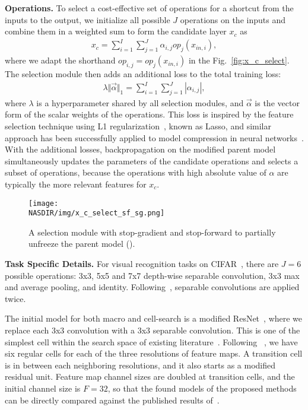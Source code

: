 \textbf{Operations.} 
To select a cost-effective set of operations for a shortcut from the inputs to the output, we initialize all possible $J$ operations on the inputs and combine them in a weighted sum to form the candidate layer $x_c$ as
\begin{align}
    x_c = \sum _{i=1}^I \sum_{j=1}^J \alpha_{i,j} op_j(x_{in,i}),
    \label{eq:x_c_select}
\end{align}
where we adapt the shorthand $op_{i,j} = op_j(x_{in,i})$ in the Fig.~\ref{fig:x_c_select}. 
The selection module then adds an additional loss to the total training loss:
\begin{align}
    \lambda \Vert \vec{\alpha} \Vert_1 = \sum_{i=1}^I \sum _{j=1}^J | \alpha _{i,j} |,
    \label{eq:x_c_select_loss}
\end{align} 
where $\lambda$ is a hyperparameter shared by all selection modules, and $\vec{\alpha}$ is the vector form of the scalar weights of the operations. This loss is inspired by the feature selection technique using L1 regularization~\citep{lasso}, known as Lasso, and similar approach has been successfully applied to model compression in neural networks~\citep{huang2017condensenet}. With the additional losses, backpropagation on the modified parent model simultaneously updates the parameters of the candidate operations and selects a subset of operations, because the operations with high absolute value of $\alpha$ are typically the more relevant features for $x_c$. 

\begin{figure}[t]
\centering
    \texttt{[image: \\NASDIR/img/x\_c\_select\_sf\_sg.png]}
    \caption{A selection module with stop-gradient and stop-forward to partially unfreeze the parent model (\petridishhard).}
    \label{fig:x_c_select_sf_sg}
\end{figure}

\textbf{Task Specific Details.}
For visual recognition tasks on CIFAR~\citep{cifar}, there are $J=6$ possible operations: 3x3, 5x5 and 7x7 depth-wise separable convolution, 3x3 max and average pooling, and identity. Following~\citep{NASCell,Real2018RegularizedEF,Pham2018EfficientNA}, separable convolutions are applied twice. 

The initial model for both macro and cell-search is a modified ResNet~\citep{resnet}, where we replace each 3x3 convolution with a 3x3 separable convolution. This is one of the simplest cell within the search space of existing literature~\citep{NASCell,Pham2018EfficientNA,Liu2018DARTSDA}.  Following ~\citep{nas,NASCell}, we have six regular cells for each of the three resolutions of feature maps.
A transition cell is in between each neighboring resolutions, and it also starts as a modified residual unit. Feature map channel sizes are doubled at transition cells, and the initial channel size is $F=32$, so that the found models of the proposed methods can be directly compared against the published results of~\citep{NASCell}. 

